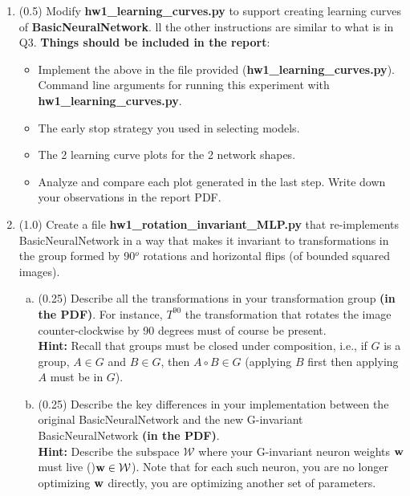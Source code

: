 \documentclass{article}
\newcommand{\homeworknumber}{1}
\begin{document}
\begin{enumerate}
 \item (0.5) \noindent Modify \textbf{hw\homeworknumber\_learning\_curves.py} to support creating learning curves of \textbf{BasicNeuralNetwork}.
ll the other instructions are similar to what is in Q3. \textbf{Things should be included in the report}:
  \begin{itemize}
    \item Implement the above in the file provided (\textbf{hw\homeworknumber\_learning\_curves.py}). Command line arguments for running this experiment with \textbf{hw\homeworknumber\_learning\_curves.py}.
    \item The early stop strategy you used in selecting models.
    \item The 2 learning curve plots for the 2 network shapes.
    \item Analyze and compare each plot generated in the last step. Write down
          your observations in the report PDF.
  \end{itemize}
  \item (1.0) Create a file \textbf{hw\homeworknumber\_rotation\_invariant\_MLP.py} that re-implements BasicNeuralNetwork in a way that makes it invariant to transformations in the group formed by 90$^o$ rotations and horizontal flips (of bounded squared images).\\
 \begin{enumerate}[(a)]
 \item (0.25)  Describe all the transformations in your transformation group {\bf (in the PDF)}. For instance, $T^{90}$ the transformation that rotates the image counter-clockwise by 90 degrees must of course be present.\\
 {\bf Hint:} Recall that groups must be closed under composition, i.e., if $G$ is a group, $A \in G$ and $B \in G$, then $A \circ B \in G$ (applying $B$ first then applying $A$ must be in $G$).\\
\vspace{3in}
\item (0.25)  Describe the key differences in your implementation between the original BasicNeuralNetwork and the new G-invariant BasicNeuralNetwork {\bf (in the PDF)}.\\
{\bf Hint:}  Describe the subspace  $\mathcal{W}$ where your G-invariant neuron weights ${\bf w}$ must live ()${\bf w} \in\mathcal{W}$). Note that for each such neuron, you are no longer optimizing ${\bf w}$ directly, you are optimizing another set of parameters.  \\
\vspace{3in}

\end{enumerate}
\end{enumerate}
\end{document}
